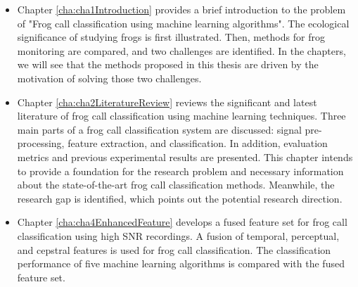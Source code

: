 \begin{itemize}


\item  Chapter \ref{cha:cha1Introduction} provides a brief introduction to the problem of "Frog call classification using machine learning algorithms".
The ecological significance of studying frogs is first illustrated. Then, methods for frog monitoring are compared, and two challenges are identified. In the chapters, we will see that the methods proposed in this thesis are driven by the motivation of solving those two challenges.


\item Chapter \ref{cha:cha2LiteratureReview} reviews the significant and latest literature of frog call classification using machine learning techniques. Three main parts of a frog call classification system are discussed: signal pre-processing, feature extraction, and classification. 
In addition, evaluation metrics and previous experimental results are presented. This chapter intends to provide a foundation for the research problem and necessary information about the state-of-the-art frog call classification methods. Meanwhile, the research gap is identified, which points out the potential research direction.


\item Chapter \ref{cha:cha4EnhancedFeature} develops a fused feature set for frog call classification using high SNR recordings. A fusion of temporal, perceptual, and cepstral features is used for frog call classification. The classification performance of five machine learning algorithms is compared with the fused feature set. 




\end{itemize}
